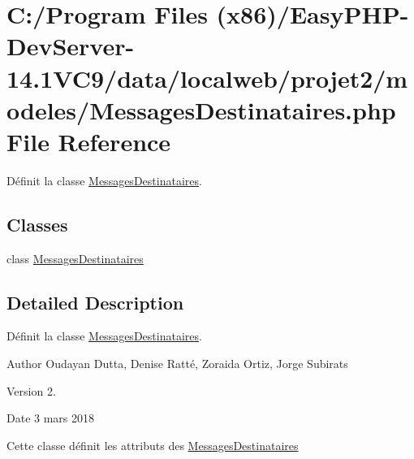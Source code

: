 \hypertarget{_messages_destinataires_8php}{}\section{C\+:/\+Program Files (x86)/\+Easy\+P\+H\+P-\/\+Dev\+Server-\/14.1\+V\+C9/data/localweb/projet2/modeles/\+Messages\+Destinataires.php File Reference}
\label{_messages_destinataires_8php}


Définit la classe \hyperlink{class_messages_destinataires}{Messages\+Destinataires}.  


\subsection*{Classes}
\begin{DoxyCompactItemize}
\item 
class \hyperlink{class_messages_destinataires}{Messages\+Destinataires}
\end{DoxyCompactItemize}


\subsection{Detailed Description}
Définit la classe \hyperlink{class_messages_destinataires}{Messages\+Destinataires}. 

\begin{DoxyAuthor}{Author}
Oudayan Dutta, Denise Ratté, Zoraida Ortiz, Jorge Subirats 
\end{DoxyAuthor}
\begin{DoxyVersion}{Version}
2. 
\end{DoxyVersion}
\begin{DoxyDate}{Date}
3 mars 2018
\end{DoxyDate}
Cette classe définit les attributs des \hyperlink{class_messages_destinataires}{Messages\+Destinataires} 